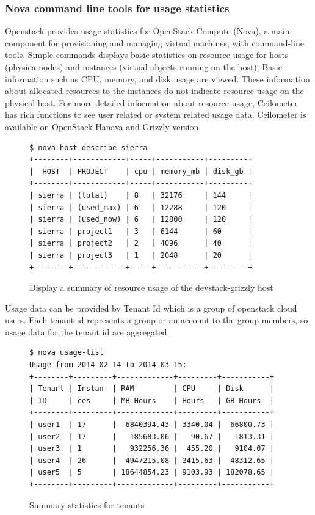 \documentclass{sig-alternate-05-2015}
\begin{document}
\subsubsection{Nova command line tools for usage statistics}

Openstack provides usage statistics for OpenStack Compute (Nova), a main component for provisioning and managing virtual machines, with command-line tools. Simple commands displays basic statistics on resource usage for hosts (physica nodes) and instances (virtual objects running on the host). Basic information such as CPU, memory, and disk usage are viewed. These information about allocated resources to the instances do not indicate resource usage on the physical host. For more detailed information about resource usage, Ceilometer has rich functions to see user related or system related usage data. Ceilometer is available on OpenStack Hanava and Grizzly version. 

\begin{figure}[h!]
\begin{small}
\begin{verbatim}
$ nova host-describe sierra
+--------+------------+-----+-----------+---------+
|  HOST  | PROJECT    | cpu | memory_mb | disk_gb |
+--------+------------+-----+-----------+---------+
| sierra | (total)    | 8   | 32176     | 144     |
| sierra | (used_max) | 6   | 12288     | 120     |
| sierra | (used_now) | 6   | 12800     | 120     |
| sierra | project1   | 3   | 6144      | 60      |
| sierra | project2   | 2   | 4096      | 40      |
| sierra | project3   | 1   | 2048      | 20      |
+--------+------------+-----+-----------+---------+
\end{verbatim}
\end{small}
\caption{Display a summary of resource usage of the devstack-grizzly host}
\label{F:host-describe}
\end{figure}

Usage data can be provided by Tenant Id which is a group of openstack cloud users. Each tenant id represents a group or an account to the group members, so usage data for the tenant id are aggregated. 

\begin{figure}[h!]
\begin{small}
\begin{verbatim}
$ nova usage-list
Usage from 2014-02-14 to 2014-03-15:
+--------+---------+-------------+---------+-----------+
| Tenant | Instan- | RAM         | CPU     | Disk      |
| ID     | ces     | MB-Hours    | Hours   | GB-Hours  |
+--------+---------+-------------+---------+-----------+
| user1  | 17      |  6840394.43 | 3340.04 |  66800.73 |
| user2  | 17      |   185683.06 |   90.67 |   1813.31 |
| user3  | 1       |   932256.36 |  455.20 |   9104.07 |
| user4  | 26      |  4947215.08 | 2415.63 |  48312.65 |
| user5  | 5       | 18644854.23 | 9103.93 | 182078.65 |
+--------+---------+-------------+---------+-----------+
\end{verbatim}
\end{small}

\caption{Summary statistics for tenants}
\label{F:host-describe}

\end{figure}
\end{document}
